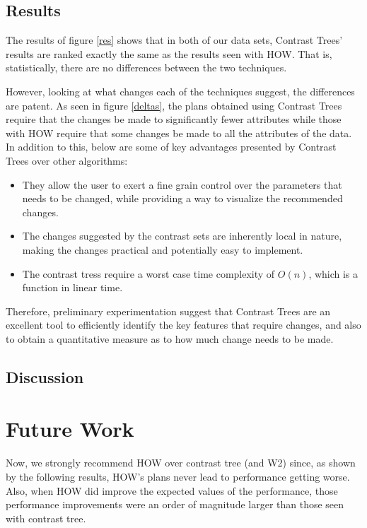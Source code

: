 \documentclass[conference]{IEEEtran}
\begin{document}
	\subsection{Results}
	The results of figure \ref{res} shows that in both of our
 data sets, Contrast Trees' results are ranked exactly the same as the results seen
 with HOW. That is, statistically, there are no differences between the two techniques. 
 
 However, looking at what changes each of the techniques suggest, the differences are patent. As seen in figure \ref{deltas}, the plans obtained using Contrast Trees require that the changes be made to significantly fewer attributes while those with HOW require that some changes be made to all the attributes of the data. In addition to this, below are some of key advantages presented by Contrast Trees over other algorithms:
	
	\begin{itemize}
		\item They allow the user to exert a fine grain control over the parameters that needs to be changed, while providing a way to visualize the recommended changes.
		\item The changes suggested by the contrast sets are inherently local in nature, making the changes practical and potentially easy to implement.
		\item The contrast tress require a worst case time complexity of $O(n)$, which is a function in linear time.
	\end{itemize}

Therefore, preliminary experimentation suggest that Contrast  Trees  are  an excellent tool to efficiently identify the key features that require changes, and also  to  obtain  a  quantitative  measure  as  to  how much change needs to be made.

	\subsection{Discussion}

 
	\section{Future Work}
	Now, we strongly recommend HOW over contrast tree (and W2) since, as shown by the following results, HOW’s plans never lead to performance getting worse. Also, when HOW did improve the expected values of the performance, those performance improvements were an order of magnitude larger than those seen with contrast tree. 


\end{document}
